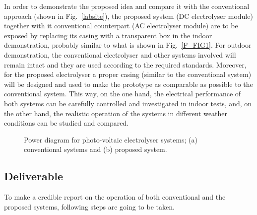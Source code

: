\documentclass[1pt]{extarticle}
\begin{document}
In order to demonstrate the proposed idea and compare it with the conventional approach (shown in Fig.~\ref{labsite}), the proposed system (DC electrolyser module) together with it conventional counterpart (AC electrolyser module) are to be exposed by replacing its casing with a transparent box in the indoor demonstration, probably similar to what is shown in Fig.~\ref{F_FIG1}. For outdoor demonstration, the conventional electrolyser and other systems involved will remain intact and they are used according to the required standards. Moreover, for the proposed electrolyser a proper casing (similar to the conventional system) will be designed and used to make the prototype as comparable as possible to the conventional system. This way, on the one hand, the electrical performance of both systems can be carefully controlled and investigated in indoor tests, and, on the other hand, the realistic operation of the systems in different weather conditions can be studied and compared.


\begin{figure} [t!]
    \begin{center}
    \caption{Power diagram for photo-voltaic electrolyser systems; (a) conventional systems and (b) proposed system.}
    \label{F_FIG2}
    \end{center}
    \vspace{-0.5cm}
\end{figure}

\subsection{Deliverable}
To make a credible report on the operation of both conventional and the proposed systems, following steps are going to be taken.
\end{document}
